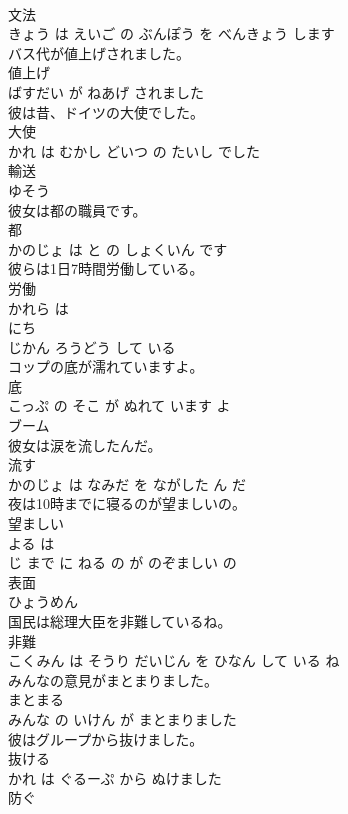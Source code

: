 \documentclass[8pt]{extreport}
\begin{document}
\begin{CJK}{UTF8}{min}
\\	文法 
\\	きょう は えいご の ぶんぽう を べんきょう します			
\\	バス代が値上げされました。	
\\	値上げ 
\\	ばすだい が ねあげ されました			
\\	彼は昔、ドイツの大使でした。	
\\	大使 
\\	かれ は むかし どいつ の たいし でした			
\\	輸送	
\\	ゆそう		
\\	彼女は都の職員です。	
\\	都 
\\	かのじょ は と の しょくいん です			
\\	彼らは1日7時間労働している。	
\\	労働 
\\	かれら は 
\\	にち 
\\	じかん ろうどう して いる			
\\	コップの底が濡れていますよ。	
\\	底 
\\	こっぷ の そこ が ぬれて います よ			
\\	ブーム	
\\	彼女は涙を流したんだ。	
\\	流す 
\\	かのじょ は なみだ を ながした ん だ			
\\	夜は10時までに寝るのが望ましいの。	
\\	望ましい 
\\	よる は 
\\	じ まで に ねる の が のぞましい の			
\\	表面	
\\	ひょうめん		
\\	国民は総理大臣を非難しているね。	
\\	非難 
\\	こくみん は そうり だいじん を ひなん して いる ね			
\\	みんなの意見がまとまりました。	
\\	まとまる 
\\	みんな の いけん が まとまりました			
\\	彼はグループから抜けました。	
\\	抜ける 
\\	かれ は ぐるーぷ から ぬけました			
\\	防ぐ	

\end{CJK}
\end{document}
